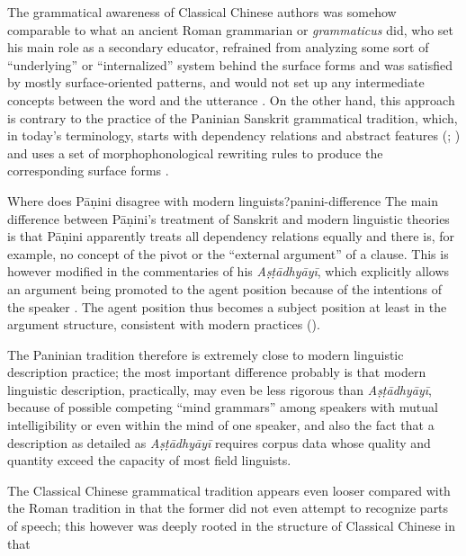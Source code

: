 \documentclass[UTF8, a4paper, oneside, scheme=plain, 12pt]{ctexrep}
\newcommand*{\citepages}[1]{pp.~{#1}}
\newcommand{\form}[1]{\emph{#1}}
\newcommand{\work}[1]{\textit{#1}}
\begin{document}
The grammatical awareness of Classical Chinese authors was somehow comparable to 
what an ancient Roman grammarian or \form{grammaticus} did,
who set his main role as a secondary educator,
refrained from analyzing some sort of ``underlying'' or ``internalized'' system behind the surface forms
and was satisfied by mostly surface-oriented patterns,
and would not set up any intermediate concepts between the word and the utterance
\citep[\citepages{7,35,47-48}]{matthews2019graeco}.
On the other hand, this approach is contrary to the practice
of the Paninian Sanskrit grammatical tradition,
which, in today's terminology, starts with dependency relations  and abstract features (; )
and uses a set of morphophonological rewriting rules to produce the corresponding surface forms
\citep{kiparsky2009architecture}.

\begin{theorybox}{Where does Pāṇini disagree with modern linguists?}{panini-difference}
    The main difference between Pāṇini's treatment of Sanskrit and modern linguistic theories
    is that Pāṇini apparently treats all dependency relations equally
    and there is, for example, no concept of the pivot or the ``external argument'' of a clause.
    This is however modified in the commentaries of his \work{Aṣṭādhyāyī},
    which explicitly allows an argument being promoted to the agent position 
    because of the intentions of the speaker \citep{keidan2017subjecthood}.
    The agent position thus becomes a subject position at least in the argument structure, consistent with modern practices ().

    The Paninian tradition therefore is extremely close to modern linguistic description practice;
    the most important difference probably is that
    modern linguistic description, practically, may even be less rigorous than \work{Aṣṭādhyāyī},
    because of possible competing ``mind grammars'' among speakers with mutual intelligibility
    or even within the mind of one speaker,
    and also the fact that a description as detailed as \work{Aṣṭādhyāyī}
    requires corpus data whose quality and quantity exceed the capacity of most field linguists.
\end{theorybox}

The Classical Chinese grammatical tradition appears even looser compared with the Roman tradition
in that the former did not even attempt to recognize parts of speech;
this however was deeply rooted in the structure of Classical Chinese
in that 
\end{document}
